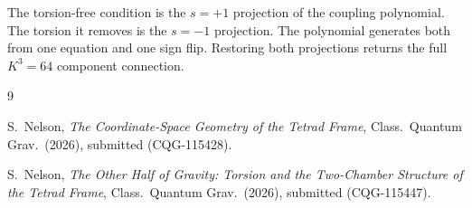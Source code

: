 \documentclass[11pt]{article}
\begin{document}
The torsion-free condition is the $s = +1$ projection of the
coupling polynomial.  The torsion it removes is the $s = -1$
projection.  The polynomial generates both from one equation
and one sign flip.  Restoring both projections returns the
full $K^3 = 64$ component connection.

\begin{thebibliography}{9}

S.~Nelson,
\textit{The Coordinate-Space Geometry of the Tetrad Frame},
Class.\ Quantum Grav.\ (2026), submitted (CQG-115428).

S.~Nelson,
\textit{The Other Half of Gravity: Torsion and the
Two-Chamber Structure of the Tetrad Frame},
Class.\ Quantum Grav.\ (2026), submitted (CQG-115447).

\end{thebibliography}
\end{document}
